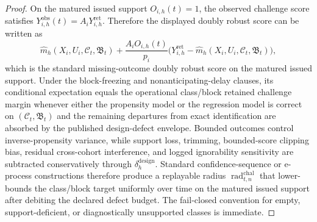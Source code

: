 \documentclass[11pt]{article}
\theoremstyle{definition}
\newcommand{\1}{\mathbf{1}}
\begin{document}
\begin{proof}
On the matured issued support $O_{i,h}(t)=1$, the observed challenge score satisfies $Y_{i,h}^{\mathrm{obs}}(t)=A_iY_{i,h}^{\mathrm{ret}}$. Therefore the displayed doubly robust score can be written as
\[
\widehat m_h(X_i,U_i,\mathcal C_t,\mathfrak B_t)+\frac{A_iO_{i,h}(t)}{p_i}\bigl(Y_{i,h}^{\mathrm{ret}}-\widehat m_h(X_i,U_i,\mathcal C_t,\mathfrak B_t)\bigr),
\]
which is the standard missing-outcome doubly robust score on the matured issued support. Under the block-freezing and nonanticipating-delay clauses, its conditional expectation equals the operational class/block retained challenge margin whenever either the propensity model or the regression model is correct on $(\mathcal C_t,\mathfrak B_t)$ and the remaining departures from exact identification are absorbed by the published design-defect envelope. Bounded outcomes control inverse-propensity variance, while support loss, trimming, bounded-score clipping bias, residual cross-cohort interference, and logged ignorability sensitivity are subtracted conservatively through $\delta_h^{\mathrm{design}}$. Standard confidence-sequence or e-process constructions therefore produce a replayable radius $\operatorname{rad}_{t,n}^{\mathrm{chal}}$ that lower-bounds the class/block target uniformly over time on the matured issued support after debiting the declared defect budget. The fail-closed convention for empty, support-deficient, or diagnostically unsupported classes is immediate.
\end{proof}
\end{document}
